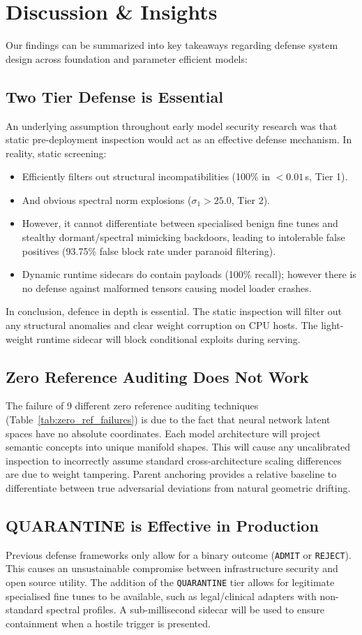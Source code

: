 \section{Discussion \& Insights}
\label{sec:discussion}

Our findings can be summarized into key takeaways regarding defense system design across foundation and parameter efficient models:

\subsection{Two Tier Defense is Essential}
An underlying assumption throughout early model security research was that static pre-deployment inspection would act as an effective defense mechanism. In reality, static screening:
\begin{itemize}
    \item Efficiently filters out structural incompatibilities (100\% in $< 0.01$\,s, Tier 1).
    \item And obvious spectral norm explosions ($\sigma_1 > 25.0$, Tier 2).
    \item However, it cannot differentiate between specialised benign fine tunes and stealthy dormant/spectral mimicking backdoors, leading to intolerable false positives (93.75\% false block rate under paranoid filtering).
    \item Dynamic runtime sidecars do contain payloads (100\% recall); however there is no defense against malformed tensors causing model loader crashes.
\end{itemize}
In conclusion, defence in depth is essential. The static inspection will filter out any structural anomalies and clear weight corruption on CPU hosts. The light-weight runtime sidecar will block conditional exploits during serving.

\subsection{Zero Reference Auditing Does Not Work}
The failure of 9 different zero reference auditing techniques (Table~\ref{tab:zero_ref_failures}) is due to the fact that neural network latent spaces have no absolute coordinates. Each model architecture will project semantic concepts into unique manifold shapes. This will cause any uncalibrated inspection to incorrectly assume standard cross-architecture scaling differences are due to weight tampering. Parent anchoring provides a relative baseline to differentiate between true adversarial deviations from natural geometric drifting.

\subsection{QUARANTINE is Effective in Production}
Previous defense frameworks only allow for a binary outcome (\texttt{ADMIT} or \texttt{REJECT}). This causes an unsustainable compromise between infrastructure security and open source utility. The addition of the \texttt{QUARANTINE} tier allows for legitimate specialised fine tunes to be available, such as legal/clinical adapters with non-standard spectral profiles. A sub-millisecond sidecar will be used to ensure containment when a hostile trigger is presented.
